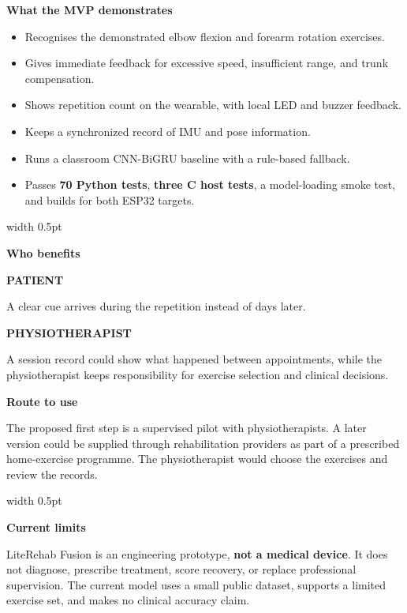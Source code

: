 \documentclass[10pt,a4paper]{article}
\newcommand{\sectiontitle}[1]{%
  {\color{PitchTeal}\bfseries\fontsize{12.2}{13.2}\selectfont #1}\par
  \vspace{1.3pt}{\color{PitchRule}\rule{\linewidth}{0.45pt}}\vspace{2.2pt}%
}
\newcommand{\smalllabel}[1]{%
  {\color{PitchTeal}\bfseries\fontsize{8.3}{9.2}\selectfont\MakeUppercase{#1}}%
}
\begin{document}
\vspace{1.0mm}
\begin{minipage}[t]{0.61\linewidth}
  \vspace{0pt}\raggedright
  \sectiontitle{What the MVP demonstrates}
  \begin{itemize}
    \item Recognises the demonstrated elbow flexion and forearm rotation exercises.
    \item Gives immediate feedback for excessive speed, insufficient range, and trunk compensation.
    \item Shows repetition count on the wearable, with local LED and buzzer feedback.
    \item Keeps a synchronized record of IMU and pose information.
    \item Runs a classroom CNN-BiGRU baseline with a rule-based fallback.
    \item Passes \textbf{70 Python tests}, \textbf{three C host tests}, a model-loading smoke test, and builds for both ESP32 targets.
  \end{itemize}
\end{minipage}\hfill
{\color{PitchRule}\vrule width 0.5pt}\hfill
\begin{minipage}[t]{0.355\linewidth}
  \vspace{0pt}\raggedright
  \sectiontitle{Who benefits}
  \smalllabel{Patient}\par
  A clear cue arrives during the repetition instead of days later.

  \vspace{2.5mm}
  \smalllabel{Physiotherapist}\par
  A session record could show what happened between appointments, while the physiotherapist keeps responsibility for exercise selection and clinical decisions.
\end{minipage}

\vspace{3.6mm}

\begin{minipage}[t]{0.485\linewidth}
  \vspace{0pt}\raggedright
  \sectiontitle{Route to use}
  The proposed first step is a supervised pilot with physiotherapists. A later version could be supplied through rehabilitation providers as part of a prescribed home-exercise programme. The physiotherapist would choose the exercises and review the records.
\end{minipage}\hfill
{\color{PitchRule}\vrule width 0.5pt}\hfill
\begin{minipage}[t]{0.485\linewidth}
  \vspace{0pt}\raggedright
  \sectiontitle{Current limits}
  LiteRehab Fusion is an engineering prototype, \textbf{not a medical device}. It does not diagnose, prescribe treatment, score recovery, or replace professional supervision. The current model uses a small public dataset, supports a limited exercise set, and makes no clinical accuracy claim.
\end{minipage}
\end{document}

